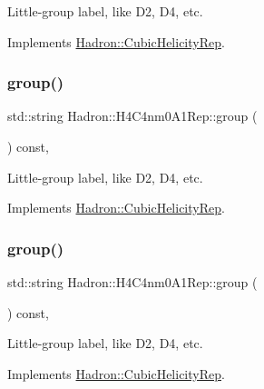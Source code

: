 Little-\/group label, like D2, D4, etc. 

Implements \mbox{\hyperlink{structHadron_1_1CubicHelicityRep_a101a7d76cd8ccdad0f272db44b766113}{Hadron\+::\+Cubic\+Helicity\+Rep}}.

\mbox{\label{structHadron_1_1H4C4nm0A1Rep_ac03a34ff386fa824b479f98878531f7b}} 
\subsubsection{\texorpdfstring{group()}{group()}\hspace{0.1cm}{\footnotesize\ttfamily [2/3]}}
{\footnotesize\ttfamily std\+::string Hadron\+::\+H4\+C4nm0\+A1\+Rep\+::group (\begin{DoxyParamCaption}{ }\end{DoxyParamCaption}) const\hspace{0.3cm}{\ttfamily [inline]}, {\ttfamily [virtual]}}

Little-\/group label, like D2, D4, etc. 

Implements \mbox{\hyperlink{structHadron_1_1CubicHelicityRep_a101a7d76cd8ccdad0f272db44b766113}{Hadron\+::\+Cubic\+Helicity\+Rep}}.

\mbox{\label{structHadron_1_1H4C4nm0A1Rep_ac03a34ff386fa824b479f98878531f7b}} 
\subsubsection{\texorpdfstring{group()}{group()}\hspace{0.1cm}{\footnotesize\ttfamily [3/3]}}
{\footnotesize\ttfamily std\+::string Hadron\+::\+H4\+C4nm0\+A1\+Rep\+::group (\begin{DoxyParamCaption}{ }\end{DoxyParamCaption}) const\hspace{0.3cm}{\ttfamily [inline]}, {\ttfamily [virtual]}}

Little-\/group label, like D2, D4, etc. 

Implements \mbox{\hyperlink{structHadron_1_1CubicHelicityRep_a101a7d76cd8ccdad0f272db44b766113}{Hadron\+::\+Cubic\+Helicity\+Rep}}.

